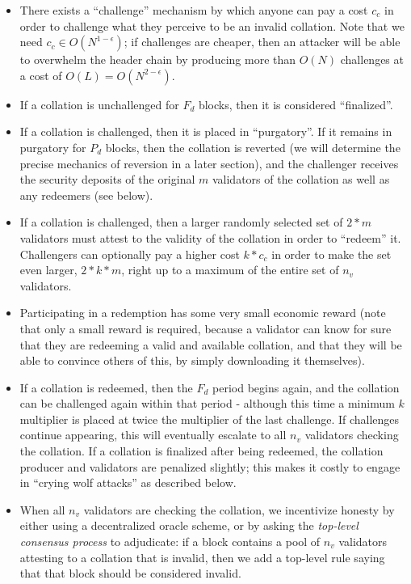 \documentclass[11pt,a4paper]{article}
\theoremstyle{plain}
\theoremstyle{definition}
\theoremstyle{remark}
\begin{document}
\begin{itemize}
\item
There exists a ``challenge'' mechanism by which anyone can pay a cost $c_c$ in order to challenge what they perceive to be an invalid collation. Note that we need $c_c \in O(N^{1-\epsilon})$; if challenges are cheaper, then an attacker will be able to overwhelm the header chain by producing more than $O(N)$ challenges at a cost of $O(L) = O(N^{2-\epsilon})$.
\item
If a collation is unchallenged for $F_d$ blocks, then it is considered ``finalized''.
\item
If a collation is challenged, then it is placed in ``purgatory''. If it remains in purgatory for $P_d$ blocks, then the collation is reverted (we will determine the precise mechanics of reversion in a later section), and the challenger receives the security deposits of the original $m$ validators of the collation as well as any redeemers (see below).
\item
If a collation is challenged, then a larger randomly selected set of $2 * m$ validators must attest to the validity of the collation in order to ``redeem'' it. Challengers can optionally pay a higher cost $k * c_c$ in order to make the set even larger, $2 * k * m$, right up to a maximum of the entire set of $n_v$ validators.
\item
Participating in a redemption has some very small economic reward (note that only a small reward is required, because a validator can know for sure that they are redeeming a valid and available collation, and that they will be able to convince others of this, by simply downloading it themselves).
\item
If a collation is redeemed, then the $F_d$ period begins again, and the collation can be challenged again within that period - although this time a minimum $k$ multiplier is placed at twice the multiplier of the last challenge. If challenges continue appearing, this will eventually escalate to all $n_v$ validators checking the collation. If a collation is finalized after being redeemed, the collation producer and validators are penalized slightly; this makes it costly to engage in ``crying wolf attacks'' as described below.
\item
When all $n_v$ validators are checking the collation, we incentivize honesty by either using a decentralized oracle scheme, or by asking the \emph{top-level consensus process} to adjudicate: if a block contains a pool of $n_v$ validators attesting to a collation that is invalid, then we add a top-level rule saying that that block should be considered invalid.
\end{itemize}
\end{document}
